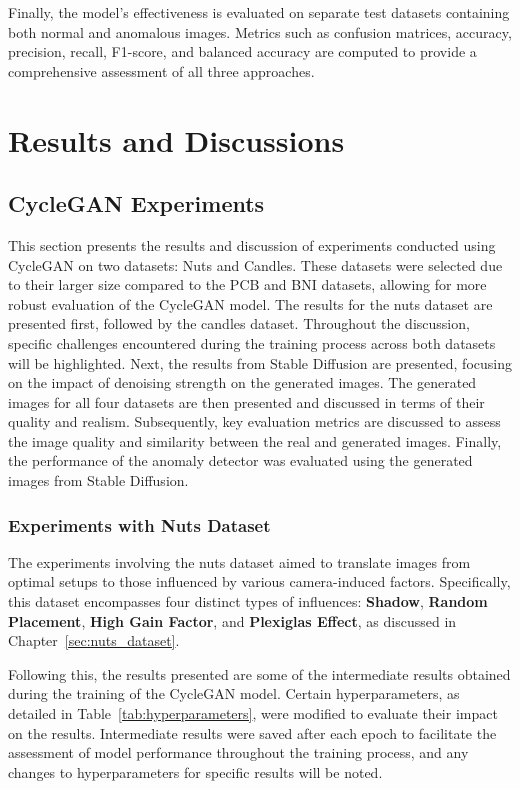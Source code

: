 \documentclass[12pt,DIV14,BCOR12mm,a4paper,footinclude=false,headinclude,parskip=half-,twoside,openright,cleardoublepage=empty,toc=index,bibliography=totoc,listof=totoc]{scrreprt}
\numberwithin{equation}{chapter}
\begin{document}
Finally, the model's effectiveness is evaluated on separate test datasets containing both normal and anomalous images. Metrics such as confusion matrices, accuracy, precision, recall, F1-score, and balanced accuracy are computed to provide a comprehensive assessment of all three approaches.

\chapter{Results and Discussions}
\label{chapter4}
\section{CycleGAN Experiments}
This section presents the results and discussion of experiments conducted using CycleGAN on two datasets: Nuts and Candles. These datasets were selected due to their larger size compared to the PCB and BNI datasets, allowing for more robust evaluation of the CycleGAN model. The results for the nuts dataset are presented first, followed by the candles dataset. Throughout the discussion, specific challenges encountered during the training process across both datasets will be highlighted. Next, the results from Stable Diffusion are presented, focusing on the impact of denoising strength on the generated images. The generated images for all four datasets are then presented and discussed in terms of their quality and realism. Subsequently, key evaluation metrics are discussed to assess the image quality and similarity between the real and generated images. Finally, the performance of the anomaly detector was evaluated using the generated images from Stable Diffusion.

\subsection{Experiments with Nuts Dataset}
\label{sec:cyclegan_nuts}
The experiments involving the nuts dataset aimed to translate images from optimal setups to those influenced by various camera-induced factors. Specifically, this dataset encompasses four distinct types of influences: \textbf{Shadow}, \textbf{Random Placement}, \textbf{High Gain Factor}, and \textbf{Plexiglas Effect}, as discussed in Chapter~\ref{sec:nuts_dataset}.

Following this, the results presented are some of the intermediate results obtained during the training of the CycleGAN model. Certain hyperparameters, as detailed in Table~\ref{tab:hyperparameters}, were modified to evaluate their impact on the results. Intermediate results were saved after each epoch to facilitate the assessment of model performance throughout the training process, and any changes to hyperparameters for specific results will be noted.
\end{document}

